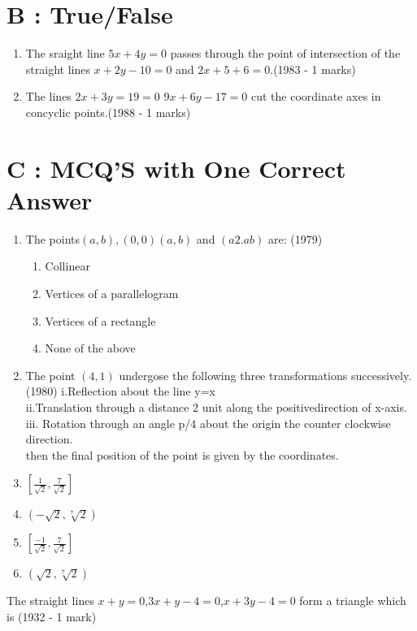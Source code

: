 \documentclass[12pt]{article}
\begin{document}
\section*{B    :    True/False}
\begin{enumerate}

\item  The sraight line $5x+4y=0$ passes through the point of intersection of the straight lines $x+2y-10=0$ and $2x+5+6=0$.(1983 - 1 marks)\\
\item The lines $2x+3y=19=0$ $9x+6y-17=0$ cut the coordinate axes in concyclic points.(1988 - 1 marks)\\
\end{enumerate}

\section*{C  :   MCQ'S with One Correct Answer}
\begin{enumerate}

\item The points$(a,b),(0,0)(a,b)$ and $(a2.ab)$ are: (1979)
\begin{enumerate}
\item Collinear
\item Vertices of a parallelogram
\item Vertices of a rectangle
\item None of the above
\end{enumerate}
\item The point $(4,1)$ undergose the following three transformations successively.(1980)
i.Reflection about the line y=x\\
ii.Translation through a distance 2 unit along the positivedirection of x-axis.\\
iii. Rotation through an angle p/4 about the origin the counter clockwise direction.\\
then the final position of the point is given by the coordinates. 
\item  $ [\frac{1}{\sqrt{2}},\frac{7}{\sqrt{2}}]$  
\item  $(-\sqrt{2}, \sqrt[7]{2})$  
\item  $[\frac{-1}{\sqrt{2}},\frac{7}{\sqrt{2}}]$
\item  $(\sqrt{2}, \sqrt[7]{2})$
\end{enumerate}
\item The straight lines $x+y=0$,$3x+y-4=0$,$x+3y-4=0$ form a triangle which is (1932 - 1 mark)
\end{document}
